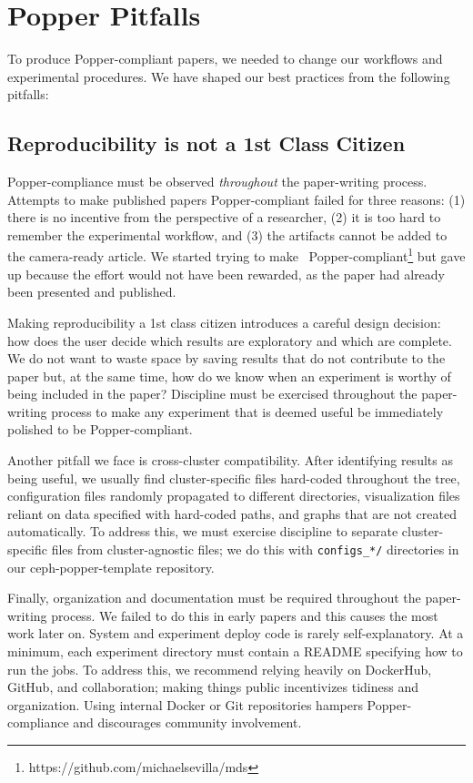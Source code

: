 \section{Popper Pitfalls}
\label{popper-best-practices}

To produce Popper-compliant papers, we needed to change our workflows and
experimental procedures. We have shaped our best practices from the following pitfalls:

\subsection{Reproducibility is not a 1st Class Citizen}
\label{sec:repro}

Popper-compliance must be observed {\it throughout} the paper-writing process.
Attempts to make published papers Popper-compliant failed for three reasons:
(1) there is no incentive from the perspective of a researcher, (2) it is too
hard to remember the experimental workflow, and (3) the artifacts cannot be
added to the camera-ready article. We started trying to
make~\cite{sevilla:sc15-mantle}
Popper-compliant\footnote{https://github.com/michaelsevilla/mds} but gave up
because the effort would not have been rewarded, as the paper had already been
presented and published.

Making reproducibility a 1st class citizen introduces a careful design
decision: how does the user decide which results are exploratory and which are
complete. We do not want to waste space by saving results that do not
contribute to the paper but, at the same time, how do we know when an
experiment is worthy of being included in the paper? Discipline must be
exercised throughout the paper-writing process to make any experiment that is
deemed useful be immediately polished to be Popper-compliant.

Another pitfall we face is cross-cluster compatibility. After identifying
results as being useful, we usually find cluster-specific files hard-coded
throughout the tree, configuration files randomly propagated to different
directories, visualization files reliant on data specified with hard-coded
paths, and graphs that are not created automatically. To address this, we must
exercise discipline to separate cluster-specific files from cluster-agnostic
files; we do this with \texttt{configs\_*/} directories in our
ceph-popper-template repository.

Finally, organization and documentation must be required throughout the
paper-writing process. We failed to do this in early papers and this causes the
most work later on. System and experiment deploy code is rarely
self-explanatory. At a minimum, each experiment directory must contain a README
specifying how to run the jobs. To address this, we recommend relying heavily
on DockerHub, GitHub, and collaboration; making things public incentivizes 
tidiness and organization. Using internal Docker or Git repositories hampers
Popper-compliance and discourages community involvement.

